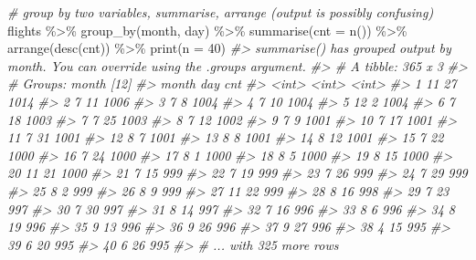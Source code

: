 \documentclass[
]{book}
\newenvironment{Shaded}{\begin{snugshade}}{\end{snugshade}}
\newcommand{\AttributeTok}[1]{\textcolor[rgb]{0.77,0.63,0.00}{#1}}
\newcommand{\CommentTok}[1]{\textcolor[rgb]{0.56,0.35,0.01}{\textit{#1}}}
\newcommand{\DecValTok}[1]{\textcolor[rgb]{0.00,0.00,0.81}{#1}}
\newcommand{\FunctionTok}[1]{\textcolor[rgb]{0.00,0.00,0.00}{#1}}
\newcommand{\NormalTok}[1]{#1}
\newcommand{\SpecialCharTok}[1]{\textcolor[rgb]{0.00,0.00,0.00}{#1}}
\begin{document}
\begin{Shaded}
\begin{Highlighting}[]
\CommentTok{\# group by two variables, summarise, arrange (output is possibly confusing)}
\NormalTok{flights }\SpecialCharTok{\%\textgreater{}\%} \FunctionTok{group\_by}\NormalTok{(month, day) }\SpecialCharTok{\%\textgreater{}\%} \FunctionTok{summarise}\NormalTok{(}\AttributeTok{cnt =} \FunctionTok{n}\NormalTok{()) }\SpecialCharTok{\%\textgreater{}\%} \FunctionTok{arrange}\NormalTok{(}\FunctionTok{desc}\NormalTok{(cnt)) }\SpecialCharTok{\%\textgreater{}\%} \FunctionTok{print}\NormalTok{(}\AttributeTok{n =} \DecValTok{40}\NormalTok{)}
\CommentTok{\#\textgreater{} \textasciigrave{}summarise()\textasciigrave{} has grouped output by \textquotesingle{}month\textquotesingle{}. You can override using the \textasciigrave{}.groups\textasciigrave{} argument.}
\CommentTok{\#\textgreater{} \# A tibble: 365 x 3}
\CommentTok{\#\textgreater{} \# Groups:   month [12]}
\CommentTok{\#\textgreater{}    month   day   cnt}
\CommentTok{\#\textgreater{}    \textless{}int\textgreater{} \textless{}int\textgreater{} \textless{}int\textgreater{}}
\CommentTok{\#\textgreater{}  1    11    27  1014}
\CommentTok{\#\textgreater{}  2     7    11  1006}
\CommentTok{\#\textgreater{}  3     7     8  1004}
\CommentTok{\#\textgreater{}  4     7    10  1004}
\CommentTok{\#\textgreater{}  5    12     2  1004}
\CommentTok{\#\textgreater{}  6     7    18  1003}
\CommentTok{\#\textgreater{}  7     7    25  1003}
\CommentTok{\#\textgreater{}  8     7    12  1002}
\CommentTok{\#\textgreater{}  9     7     9  1001}
\CommentTok{\#\textgreater{} 10     7    17  1001}
\CommentTok{\#\textgreater{} 11     7    31  1001}
\CommentTok{\#\textgreater{} 12     8     7  1001}
\CommentTok{\#\textgreater{} 13     8     8  1001}
\CommentTok{\#\textgreater{} 14     8    12  1001}
\CommentTok{\#\textgreater{} 15     7    22  1000}
\CommentTok{\#\textgreater{} 16     7    24  1000}
\CommentTok{\#\textgreater{} 17     8     1  1000}
\CommentTok{\#\textgreater{} 18     8     5  1000}
\CommentTok{\#\textgreater{} 19     8    15  1000}
\CommentTok{\#\textgreater{} 20    11    21  1000}
\CommentTok{\#\textgreater{} 21     7    15   999}
\CommentTok{\#\textgreater{} 22     7    19   999}
\CommentTok{\#\textgreater{} 23     7    26   999}
\CommentTok{\#\textgreater{} 24     7    29   999}
\CommentTok{\#\textgreater{} 25     8     2   999}
\CommentTok{\#\textgreater{} 26     8     9   999}
\CommentTok{\#\textgreater{} 27    11    22   999}
\CommentTok{\#\textgreater{} 28     8    16   998}
\CommentTok{\#\textgreater{} 29     7    23   997}
\CommentTok{\#\textgreater{} 30     7    30   997}
\CommentTok{\#\textgreater{} 31     8    14   997}
\CommentTok{\#\textgreater{} 32     7    16   996}
\CommentTok{\#\textgreater{} 33     8     6   996}
\CommentTok{\#\textgreater{} 34     8    19   996}
\CommentTok{\#\textgreater{} 35     9    13   996}
\CommentTok{\#\textgreater{} 36     9    26   996}
\CommentTok{\#\textgreater{} 37     9    27   996}
\CommentTok{\#\textgreater{} 38     4    15   995}
\CommentTok{\#\textgreater{} 39     6    20   995}
\CommentTok{\#\textgreater{} 40     6    26   995}
\CommentTok{\#\textgreater{} \# ... with 325 more rows}


\end{Highlighting}
\end{Shaded}
\end{document}
